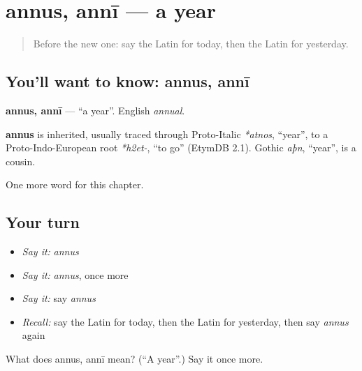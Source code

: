 \section[annus, annī]{annus, annī — a year}

\label{lesson:LA-C103-annus}



\begin{quote}
Before the new one: say the Latin for today, then the Latin for yesterday.
\end{quote}

\subsection*{You'll want to know: annus, annī}
\textbf{annus, annī} — \textquotedblleft{}a year\textquotedblright{}. English \emph{annual}.

\begin{cousinweb}
\textbf{annus} is inherited, usually traced through Proto-Italic \emph{*atnos}, \textquotedblleft{}year\textquotedblright{}, to a Proto-Indo-European root \emph{*h2et-}, \textquotedblleft{}to go\textquotedblright{} (EtymDB 2.1). Gothic \emph{aþn}, \textquotedblleft{}year\textquotedblright{}, is a cousin.
\end{cousinweb}

\begin{grammarlens}[title={What you've built}]
One more word for this chapter.
\end{grammarlens}

\subsection*{Your turn}
\begin{itemize}
\raggedright
  \item \emph{Say it:} \emph{annus}
  \item \emph{Say it:} \emph{annus}, once more
  \item \emph{Say it:} say \emph{annus}
  \item \emph{Recall:} say the Latin for today, then the Latin for yesterday, then say \emph{annus} again
\end{itemize}

\begin{tcolorbox}[breakable,colback=teal!4,colframe=teal!35!black,title={Before you move on}]
What does annus, annī mean? (\textquotedblleft{}A year\textquotedblright{}.) Say it once more.
\end{tcolorbox}
